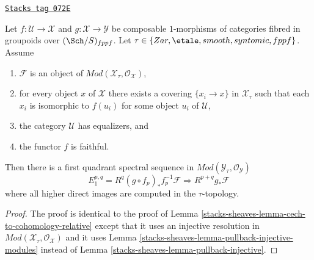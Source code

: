 \begin{lemma}
\label{stacks-sheaves-lemma-cech-to-cohomology-relative-modules}
\href{https://stacks.math.columbia.edu/tag/072E}{\texttt{Stacks tag 072E}}

Let $f : \mathcal{U} \to \mathcal{X}$ and
$g : \mathcal{X} \to \mathcal{Y}$
be composable $1$-morphisms of categories fibred
in groupoids over $(\Sch/S)_{fppf}$. Let
$\tau \in \{Zar, \etale, smooth, syntomic, \linebreak[0] fppf\}$.
Assume
\begin{enumerate}
\item $\mathcal{F}$ is an object of
$\textit{Mod}(\mathcal{X}_\tau, \mathcal{O}_\mathcal{X})$,
\item for every object $x$ of $\mathcal{X}$ there exists a covering
$\{x_i \to x\}$ in $\mathcal{X}_\tau$ such that each $x_i$ is isomorphic
to $f(u_i)$ for some object $u_i$ of $\mathcal{U}$,
\item the category $\mathcal{U}$ has equalizers, and
\item the functor $f$ is faithful.
\end{enumerate}
Then there is a first quadrant spectral sequence in
$\textit{Mod}(\mathcal{Y}_\tau, \mathcal{O}_\mathcal{Y})$
$$
E_1^{p, q} = R^q(g \circ f_p)_*f_p^{-1}\mathcal{F}
\Rightarrow
R^{p + q}g_*\mathcal{F}
$$
where all higher direct images are computed in the $\tau$-topology.
\end{lemma}

\begin{proof}
The proof is identical to the proof of
Lemma \ref{stacks-sheaves-lemma-cech-to-cohomology-relative}
except that it uses an injective resolution in
$\textit{Mod}(\mathcal{X}_\tau, \mathcal{O}_\mathcal{X})$
and it uses
Lemma \ref{stacks-sheaves-lemma-pullback-injective-modules}
instead of
Lemma \ref{stacks-sheaves-lemma-pullback-injective}.
\end{proof}

